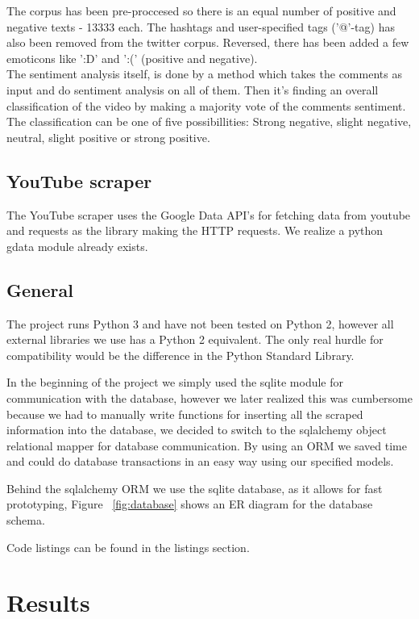 \documentclass[conference]{IEEEtran}
\begin{document}
The corpus has been pre-proccesed so there is an equal number of positive and negative texts - 13333 each. The hashtags and user-specified tags ('@'-tag) has also been removed from the twitter corpus. Reversed, there has been added a few emoticons like ':D' and ':(' (positive and negative).\\

The sentiment analysis itself, is done by a method which takes the comments as input and do sentiment analysis on all of them. Then it's finding an overall classification of the video by making a majority vote of the comments sentiment. The classification can be one of five possibillities: Strong negative, slight negative, neutral, slight positive or strong positive.


\subsection{YouTube scraper}

The YouTube scraper uses the Google Data API's for fetching data from youtube and requests as the library making the HTTP requests. We realize a python gdata module already exists.

\subsection{General}
The project runs Python 3 and have not been tested on Python 2,
however all external libraries we use has a Python 2 equivalent. 
The only real hurdle for compatibility would be the difference in the Python Standard Library.

In the beginning of the project we simply used the sqlite \cite{sqllite} module for communication with the database, however we later realized this was cumbersome because we had to manually write functions for inserting all the scraped information into the database, we decided to switch to the sqlalchemy object relational mapper \cite{sqlalchemy} for database communication. By using an ORM we saved time and could do database transactions in an easy way using our specified models.

Behind the sqlalchemy ORM we use the sqlite database, as it allows for fast prototyping, Figure ~\ref{fig:database} shows an ER diagram for the database schema.

Code listings can be found in the listings section.

\section{Results}
\end{document}
